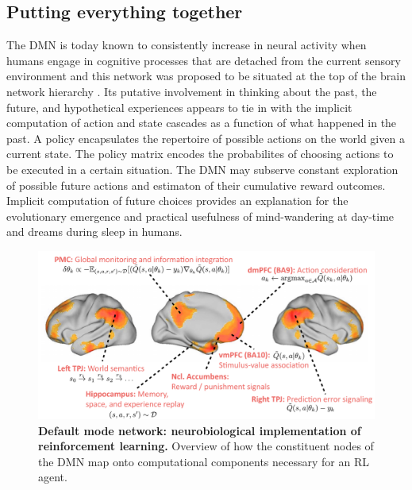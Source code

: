 \documentclass[10pt,letterpaper]{article}
\begin{document}
\subsection{Putting everything together}
The DMN is today known to consistently increase in neural
  activity when humans engage in cognitive processes that are detached from
  the current sensory environment
  \citep{kenet2003spontaneously, fiser2004small, bzdok2013segregation}
  and this network was proposed to be situated
  at the top of the brain network hierarchy
  \citep{carhart2010default, margulies2016situating}.
  Its putative involvement in thinking about the past,
  the future, and hypothetical experiences
  appears to tie in with the implicit computation of
  action and state cascades as a function of what happened in the past.
  A policy encapsulates the repertoire of possible actions
    on the world given a current state.
    The policy matrix encodes the probabilites of
    choosing actions to be executed in a certain situation.
The DMN may subserve
  constant exploration of possible future actions and estimaton of their
  cumulative reward outcomes. Implicit computation of future choices
  provides an explanation for the
  evolutionary emergence and practical usefulness of
  mind-wandering at day-time and dreams during sleep
  in humans.
\begin{figure}[!h]
  \includegraphics[width=.9\linewidth]{neurobiological_and_rl_overview_DMN.pdf}
  \caption{\textbf{Default mode network:
  neurobiological implementation of reinforcement learning.}
  Overview of how the constituent nodes of the DMN
  map onto computational components necessary for an RL agent.}
  \label{fig:rl_process_chart}
\end{figure}
\end{document}

